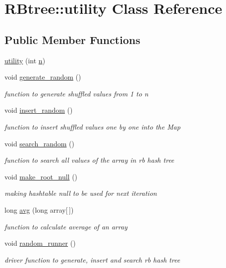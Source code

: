 \hypertarget{class_r_btree_1_1utility}{\section{R\-Btree\-:\-:utility Class Reference}
\label{class_r_btree_1_1utility}
}
\subsection*{Public Member Functions}
\begin{DoxyCompactItemize}
\item 
\hyperlink{class_r_btree_1_1utility_a01e57205438731952286a5bfd2747291}{utility} (int \hyperlink{class_r_btree_1_1utility_a5f8d03fdb96145436e2b44275f49b3ab}{n})
\item 
void \hyperlink{class_r_btree_1_1utility_abb88fd9d01ba0e0e91518351c426b06b}{generate\-\_\-random} ()
\begin{DoxyCompactList}\small\item\em function to generate shuffled values from 1 to n \end{DoxyCompactList}\item 
void \hyperlink{class_r_btree_1_1utility_a84ba000fe0da7f22d3a1d0765fa9f585}{insert\-\_\-random} ()
\begin{DoxyCompactList}\small\item\em function to insert shuffled values one by one into the Map \end{DoxyCompactList}\item 
void \hyperlink{class_r_btree_1_1utility_a60f41ab6c0bffdbae8f3a3848f5e469a}{search\-\_\-random} ()
\begin{DoxyCompactList}\small\item\em function to search all values of the array in rb hash tree \end{DoxyCompactList}\item 
void \hyperlink{class_r_btree_1_1utility_af7cfb347351185498a40144d9a399bb7}{make\-\_\-root\-\_\-null} ()
\begin{DoxyCompactList}\small\item\em making hashtable null to be used for next iteration \end{DoxyCompactList}\item 
long \hyperlink{class_r_btree_1_1utility_a20de08af04c31bb34b49e175da906eed}{avg} (long array\mbox{[}$\,$\mbox{]})
\begin{DoxyCompactList}\small\item\em function to calculate average of an array \end{DoxyCompactList}\item 
void \hyperlink{class_r_btree_1_1utility_ac0c3621f49c287aa0cd9a591236f5e1e}{random\-\_\-runner} ()
\begin{DoxyCompactList}\small\item\em driver function to generate, insert and search rb hash tree \end{DoxyCompactList}\end{DoxyCompactItemize}
